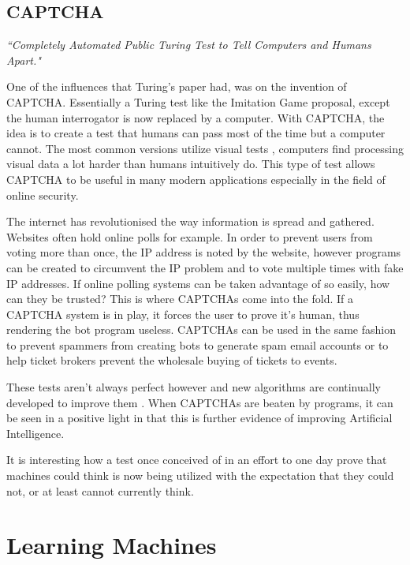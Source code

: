 \documentclass{scrartcl}
\begin{document}
\subsection{CAPTCHA}

\textit{\textquotedblleft Completely Automated Public Turing Test to Tell Computers and Humans Apart."}

One of the influences that Turing's paper had, was on the invention of CAPTCHA. Essentially a Turing test like the Imitation Game proposal, except the human interrogator is now replaced by a computer\cite{von2004telling:6}. With CAPTCHA, the idea is to create a test that humans can pass most of the time but a computer cannot. The most common versions utilize visual tests \cite{fischer2006visual:7}, computers find processing visual data a lot harder than humans intuitively do. This type of test allows CAPTCHA to be useful in many modern applications especially in the field of online security. 

The internet has revolutionised the way information is spread and gathered. Websites often hold online polls for example. In order to prevent users from voting more than once, the IP address is noted by the website, however programs can be created to circumvent the IP problem and to vote multiple times with fake IP addresses. If online polling systems can be taken advantage of so easily, how can they be trusted?  This is where CAPTCHAs come into the fold. If a CAPTCHA system is in play, it forces the user to prove it's human, thus rendering the bot program useless. CAPTCHAs can be used in the same fashion to prevent spammers from creating bots to generate spam email accounts or to help ticket brokers prevent the wholesale buying of tickets to events.

These tests aren't always perfect however and new algorithms are continually developed to improve them \cite{mori2003recognizing:8}. When CAPTCHAs are beaten by programs, it can be seen in a positive light in that this is further evidence of improving Artificial Intelligence.

It is interesting how a test once conceived of in an effort to one day prove that machines could think is now being utilized with the expectation that they could not, or at least cannot currently think. 




\section{Learning Machines}
\end{document}
